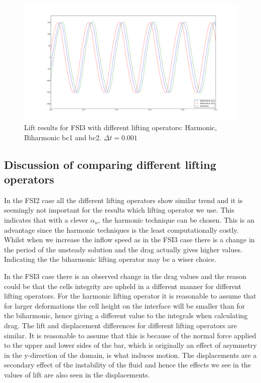\begin{figure}[]
    \label{FSI34}
    \centering
    \includegraphics[trim={3cm 3cm 3cm 3cm},scale=0.20]{./Mesh_motion_results/FSI3_dt0001_Lift.png} 
    \caption{Lift results for FSI3 with different lifting operators: Harmonic, Biharmonic bc1 and bc2. $\Delta t = 0.001$}
\end{figure}



\subsection*{Discussion of comparing different lifting operators}
In the FSI2 case all the different lifting operators show similar trend and it is seemingly not important for the results which lifting operator we use. This indicates that with a clever $\alpha_u$, the harmonic technique can be chosen. This is an advantage since the harmonic techniques is the least computationally costly. Whilst when we increase the inflow speed as in the FSI3 case there is a change in the period of the unsteady solution and the drag actually gives higher values. Indicating the the biharmonic lifting operator may be a wiser choice.

In the FSI3 case there is an observed change in the drag values and the reason could be that the cells integrity are upheld in a different manner for different lifting operators. For the harmonic lifting operator it is reasonable to assume that for larger deformations the cell height on the interface will be smaller than for the biharmonic, hence giving a different value to the integrals when calculating drag. The lift and displacement differences for different lifting operators are similar. It is reasonable to assume that this is because of the normal force applied to the upper and lower sides of the bar, which is originally an effect of asymmetry in the y-direction of the domain, is what induces motion. The displacements are a secondary effect of the instability of the fluid and hence the effects we see in the values of lift are also seen in the displacements.

